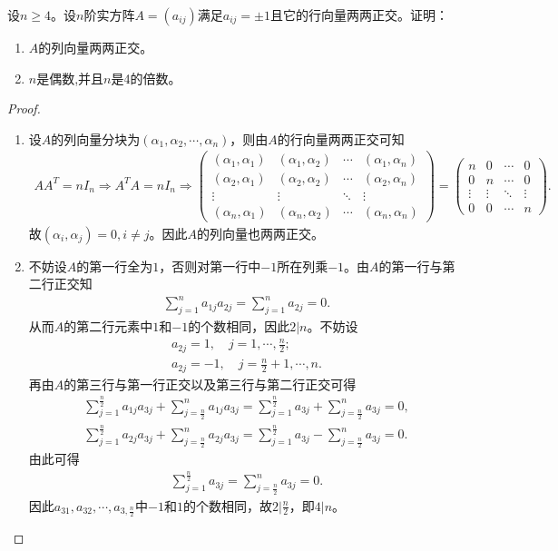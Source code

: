 \documentclass[../../main.tex]{subfiles}
\begin{document}
\begin{example}
设$n \geq 4$。设$n$阶实方阵$A = (a_{ij})$满足$a_{ij} = \pm 1$且它的行向量两两正交。证明：
\begin{enumerate}[(1)]
\item $A$的列向量两两正交。

\item $n$是偶数,并且$n$是4的倍数。
\end{enumerate}
\end{example}
\begin{proof}
\begin{enumerate}[(1)]
\item 设$A$的列向量分块为$(\alpha_1,\alpha_2,\cdots,\alpha_n)$，则由$A$的行向量两两正交可知
\begin{align*}
AA^T=nI_n\Longrightarrow A^TA=nI_n\Longrightarrow \begin{pmatrix}
(\alpha_1,\alpha_1) & (\alpha_1,\alpha_2) & \cdots & (\alpha_1,\alpha_n) \\
(\alpha_2,\alpha_1) & (\alpha_2,\alpha_2) & \cdots & (\alpha_2,\alpha_n) \\
\vdots & \vdots & \ddots & \vdots \\
(\alpha_n,\alpha_1) & (\alpha_n,\alpha_2) & \cdots & (\alpha_n,\alpha_n)
\end{pmatrix} = \begin{pmatrix}
n & 0 & \cdots & 0 \\
0 & n & \cdots & 0 \\
\vdots & \vdots & \ddots & \vdots \\
0 & 0 & \cdots & n
\end{pmatrix}.
\end{align*}
故$(\alpha_i,\alpha_j)=0,i\ne j$。因此$A$的列向量也两两正交。

\item 不妨设$A$的第一行全为$1$，否则对第一行中$-1$所在列乘$-1$。由$A$的第一行与第二行正交知
\begin{align*}
\sum_{j=1}^n a_{1j}a_{2j} = \sum_{j=1}^n a_{2j} = 0.
\end{align*}
从而$A$的第二行元素中$1$和$-1$的个数相同，因此$2|n$。不妨设
\begin{gather*}
a_{2j}=1,\quad j=1,\cdots,\frac{n}{2}; \\
a_{2j}=-1,\quad j=\frac{n}{2}+1,\cdots,n.
\end{gather*}
再由$A$的第三行与第一行正交以及第三行与第二行正交可得
\begin{align*}
\sum_{j=1}^{\frac{n}{2}} a_{1j}a_{3j} + \sum_{j=\frac{n}{2}}^n a_{1j}a_{3j} = \sum_{j=1}^{\frac{n}{2}} a_{3j} + \sum_{j=\frac{n}{2}}^n a_{3j} = 0, \\
\sum_{j=1}^{\frac{n}{2}} a_{2j}a_{3j} + \sum_{j=\frac{n}{2}}^n a_{2j}a_{3j} = \sum_{j=1}^{\frac{n}{2}} a_{3j} - \sum_{j=\frac{n}{2}}^n a_{3j} = 0.
\end{align*}
由此可得
\begin{align*}
\sum_{j=1}^{\frac{n}{2}} a_{3j} = \sum_{j=\frac{n}{2}}^n a_{3j} = 0.
\end{align*}
因此$a_{31},a_{32},\cdots,a_{3,\frac{n}{2}}$中$-1$和$1$的个数相同，故$2|\frac{n}{2}$，即$4|n$。
\end{enumerate}

\end{proof}
\end{document}
